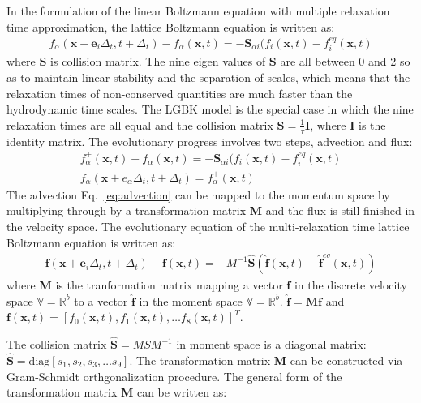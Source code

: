 In the formulation of the linear Boltzmann equation with multiple relaxation time approximation, the lattice Boltzmann equation is written as:
\begin{align}
f_{\alpha}(\mathbf{x}+\mathbf{e}_i\Delta_t, t+ \Delta_t)-f_{\alpha}(\mathbf{x},t)=-\mathbf{S}_{\alpha i}(f_i(\mathbf{x},t)-f_i^{eq}(\mathbf{x},t)
\end{align}
\flushleft where \textbf{S} is collision matrix. The nine eigen values of \textbf{S} are all between 0 and 2 so as to maintain linear stability and the separation of scales, which means that the relaxation times of non-conserved quantities are much faster than the hydrodynamic time scales. The LGBK model is the special case in which the nine relaxation times are all equal and the collision matrix $\mathbf{S}=\frac{1}{\tau}\mathbf{I}$, where \textbf{I} is the identity matrix. The evolutionary progress involves two steps, advection and flux:
\begin{align}
f_{\alpha}^+(\mathbf{x},t)-f_{\alpha}(\mathbf{x},t) = - \mathbf{S}_{\alpha i}(f_i(\mathbf{x},t)-f_i^{eq}(\mathbf{x},t) \label{eq:advection}\\
f_{\alpha}(\mathbf{x}+e_{\alpha}\Delta_t, t+\Delta_t)=f_{\alpha}^+(\mathbf{x},t)
\end{align}
\flushleft The advection Eq.~\ref{eq:advection} can be mapped to the momentum space by multiplying through by a transformation matrix \textbf{M} and the flux is still finished in the velocity space. The evolutionary equation of the multi-relaxation time lattice Boltzmann equation is written as:
\begin{align}
\mathbf{f}(\mathbf{x}+\mathbf{e}_i\Delta_t, t+ \Delta_t)-\mathbf{f}(\mathbf{x},t)=-M^{-1}\hat{\mathbf{S}}(\hat{\mathbf{f}}(\mathbf{x},t)-\hat{\mathbf{f}}^{eq}(\mathbf{x},t))
\end{align}
\flushleft where \textbf{M} is the tranformation matrix mapping a vector \textbf{f} in the discrete velocity space $\mathds{V}=\mathds{R}^b$ to a vector $\hat{\mathbf{f}}$ in the moment space $\mathds{V}=\mathds{R}^b$. 
$\hat{\mathbf{f}}= \mathbf{M}\mathbf{f}$ and 
$\mathbf{f}(\mathbf{x},t) =\left[f_0(\mathbf{x},t),f_1(\mathbf{x},t),\dots f_8(\mathbf{x},t)\right]^T$. 

The collision matrix $\hat{\mathbf{S}} = MSM^{-1}$ in moment space is a diagonal matrix: $\hat{\mathbf{S}} =\mbox{diag} \left[ s_1, s_2, s_3,\dots s_9  \right]$. The transformation matrix \textbf{M} can be constructed via Gram-Schmidt orthgonalization procedure. The general form of the transformation matrix \textbf{M} can be written as:

